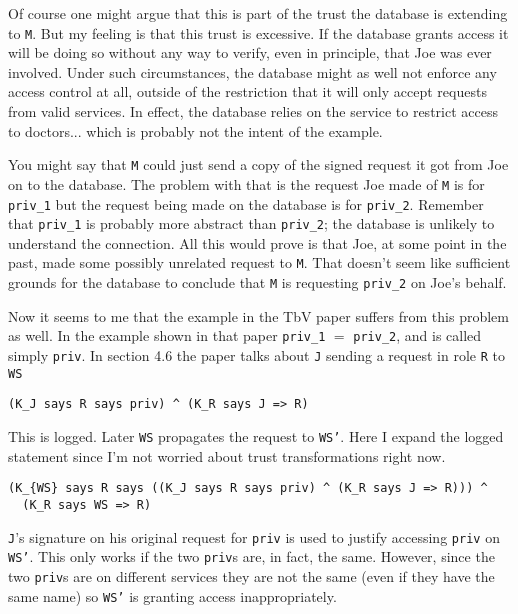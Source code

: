 \documentclass{article}
\begin{document}
Of course one might argue that this is part of the trust the database is extending to
\texttt{M}. But my feeling is that this trust is excessive. If the database grants access it
will be doing so without any way to verify, even in principle, that Joe was ever involved. Under
such circumstances, the database might as well not enforce any access control at all, outside of
the restriction that it will only accept requests from valid services. In effect, the database
relies on the service to restrict access to doctors... which is probably not the intent of the
example.

You might say that \texttt{M} could just send a copy of the signed request it got from Joe on to
the database. The problem with that is the request Joe made of \texttt{M} is for
\texttt{priv\_1} but the request being made on the database is for \texttt{priv\_2}. Remember
that \texttt{priv\_1} is probably more abstract than \texttt{priv\_2}; the database is unlikely
to understand the connection. All this would prove is that Joe, at some point in the past, made
some possibly unrelated request to \texttt{M}. That doesn't seem like sufficient grounds for the
database to conclude that \texttt{M} is requesting \texttt{priv\_2} on Joe's behalf.

Now it seems to me that the example in the TbV paper suffers from this problem as well. In the
example shown in that paper \texttt{priv\_1} $=$ \texttt{priv\_2}, and is called simply
\texttt{priv}. In section 4.6 the paper talks about \texttt{J} sending a request in role
\texttt{R} to \texttt{WS}

\begin{verbatim}
(K_J says R says priv) ^ (K_R says J => R)
\end{verbatim}

This is logged. Later \texttt{WS} propagates the request to \texttt{WS'}. Here I expand the
logged statement since I'm not worried about trust transformations right now.

\begin{verbatim}
(K_{WS} says R says ((K_J says R says priv) ^ (K_R says J => R))) ^
  (K_R says WS => R)
\end{verbatim}

\texttt{J}'s signature on his original request for \texttt{priv} is used to justify accessing
\texttt{priv} on \texttt{WS'}. This only works if the two \texttt{priv}s are, in fact, the same.
However, since the two \texttt{priv}s are on different services they are not the same (even if
they have the same name) so \texttt{WS'} is granting access inappropriately.
\end{document}
